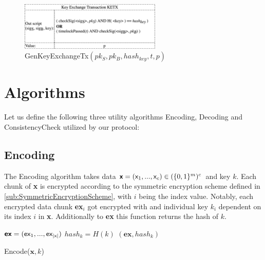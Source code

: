 \documentclass{cacthesis}
\newcounter{protocol}
\begin{document}
        \begin{figure}
            \begin{center}
              \includegraphics[width=0.6\textwidth]{images/GenKeyExchangeTx.png}
              \caption{\textsf{GenKeyExchangeTx}$(pk_S, pk_B, hash_{key}, t, p)$}
              \label{fig:genKeyExchangeTx}
            \end{center}
        \end{figure}
        
        \section{Algorithms}
        Let us define the following three utility algorithms \textsf{Encoding}, \textsf{Decoding} and \textsf{ConsistencyCheck} utilized by our protocol:
        \subsection{Encoding}
        The \textsf{Encoding} algorithm takes data $\textsf{\textbf{x}} = (\textsf{x}_1, ..., \textsf{x}_c) \in (\{0,1\}^m)^c$ and key $k$. Each chunk of \textsf{\textbf{x}} is encrypted according to the symmetric encryption scheme defined in \ref{sub:SymmetricEncryptionScheme}, with $i$ being the index value. Notably, each encrypted data chunk \textsf{\textbf{ex}}$_i$ got encrypted with and individual key $k_i$ dependent on its index $i$ in \textsf{\textbf{x}}. Additionally to \textsf{\textbf{ex}} this function returns the hash of $k$.
        \begin{center}
        \begin{minipage}[t]{4in}
            \begin{algorithm}[H]
                $\textsf{\textbf{ex}} = (\textsf{ex}_1,..., \textsf{ex}_{|\textsf{x}|})$\;
                $hash_k = H(k)$\;
                \Return $(\textbf{ex}, hash_k)$\;
                \caption{\textsf{Encode($\textbf{x}, k$)}}
            \end{algorithm}
        \end{minipage}    
        \end{center}
        
\end{document}
